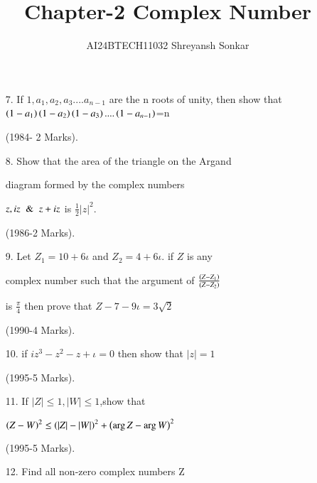 \documentclass[journal,12pt,twocolumn]{IEEEtran}
\theoremstyle{remark}
\begin{document}

\vspace{3cm}

\title{Chapter-2 Complex Number}
\author{AI24BTECH11032 Shreyansh Sonkar
}
\maketitle
\newpage
\bigskip

\renewcommand{\thefigure}{\theenumi}
\renewcommand{\thetable}{\theenumi}
\begin{enumerate}




\item[7.] If $1,a_1,a_2,a_3....a_{n-1}$
 are the n roots of unity, then show that $\left(1-a_1\right)\left(1-a_2\right)\left(1-a_3\right)....\left(1-a_{n-1}\right)$=n  
 
  \hfill (1984- 2 Marks).\\



\item[8.]  Show that the area of the 
  triangle on the Argand 
  
  diagram formed by the complex 
  numbers
  
  $z,iz \And z+iz$ 
  is $\frac{1}{2}|z|^2$.
  
  \hfill (1986-2 Marks).\\



\item[9.] Let $Z_1=10+6\iota$ and $Z_2=4+6\iota$. if $Z$ is any 

complex number such that the argument of ${\frac{\left(Z-Z_1\right)}{\left(Z-Z_2
\right)}}$

is  ${\frac{\pi}{4}}$ then prove that $Z-7-9\iota =3\sqrt{2}$
  
  \hfill(1990-4 Marks).\\


\item[10.] if {$iz^{3} -z^2-z+\iota=0$} then show that $|z| =1$

\hfill(1995-5 Marks).\\


\item[11.] If $|Z|\le1,|W|\le1$,show that

$\left(Z-W\right)^2\le\left(|Z|-|W|\right)^2+\left(\arg Z- \arg W\right)^2$ 

\hfill(1995-5 Marks). \\


\item[12.] Find all non-zero complex numbers Z 


\end{enumerate}
\end{document}
